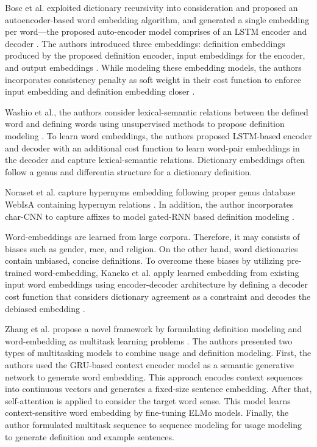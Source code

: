Bosc et al. exploited dictionary recursivity into consideration and proposed an
autoencoder-based word embedding algorithm, and generated a single embedding per
word—the proposed auto-encoder model comprises of an LSTM encoder and decoder
\cite{bosc_auto_2018}. The authors introduced three embeddings: definition
embeddings produced by the proposed definition encoder, input embeddings for the
encoder, and output embeddings \cite{bosc_auto_2018}. While modeling these
embedding models, the authors incorporates consistency penalty as soft weight in
their cost function to enforce input embedding and definition embedding closer
\cite{bosc_auto_2018}.

Washio et al., the authors consider lexical-semantic relations between the
defined word and defining words using unsupervised methods to propose definition
modeling \cite{washio_bridging_2019}. To learn word embeddings, the authors
proposed LSTM-based encoder and decoder with an additional cost function to
learn word-pair embeddings in the decoder and capture lexical-semantic
relations. Dictionary embeddings often follow a genus and differentia structure
for a dictionary definition.


Noraset et al. capture hypernyms embedding following proper genus database
WebIsA containing hypernym relations \cite{noraset_definition_2016}. In
addition, the author incorporates char-CNN to capture affixes to model gated-RNN
based definition modeling \cite{noraset_definition_2016}.

Word-embeddings are learned from large corpora. Therefore, it may consists of
biases such as gender, race, and religion. On the other hand, word dictionaries
contain unbiased, concise definitions. To overcome these biases by utilizing
pre-trained word-embedding, Kaneko et al. apply learned embedding from existing
input word embeddings using encoder-decoder architecture by defining a decoder
cost function that considers dictionary agreement as a constraint and decodes
the debiased embedding \cite{kaneko_dictionary_2021}.

Zhang et al. propose a novel framework by formulating definition modeling and
word-embedding as multitask learning problems \cite{zhang_improving_2020}. The
authors presented two types of multitasking models to combine usage and
definition modeling. First, the authors used the GRU-based context encoder model
as a semantic generative network to generate word embedding. This approach
encodes context sequences into continuous vectors and generates a fixed-size
sentence embedding. After that, self-attention is applied to consider the target
word sense. This model learns context-sensitive word embedding by fine-tuning
ELMo models. Finally, the author formulated multitask sequence to sequence
modeling for usage modeling to generate definition and example sentences.

